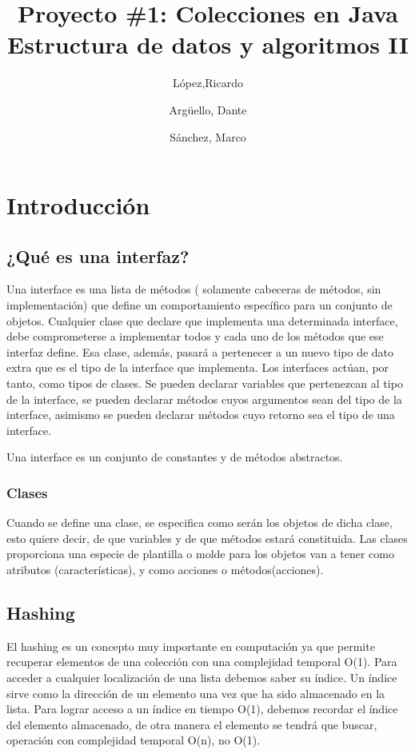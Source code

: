 \documentclass[11pt]{article}
\title{Proyecto \#1: Colecciones en Java\\
Estructura de datos y algoritmos II}
\author{López,Ricardo
\and Argüello, Dante
\and Sánchez, Marco}
\begin{document}
\maketitle{}

\section{Introducción}
\subsection{¿Qué es una interfaz?}

\par
Una interface es una lista de métodos ( solamente cabeceras de 
métodos, sin implementación) que define un comportamiento específico 
para un conjunto de objetos. Cualquier clase que declare que 
implementa una determinada interface, debe comprometerse a 
implementar todos y cada uno de los métodos que ese interfaz define. 
Esa clase, además, pasará a pertenecer a un nuevo tipo de dato extra 
que es el tipo de la interface que implementa. Los interfaces actúan, 
por tanto, como tipos de clases. Se pueden declarar variables que 
pertenezcan al tipo de la interface, se pueden declarar métodos cuyos 
argumentos sean del tipo de la interface, asimismo se pueden declarar 
métodos cuyo retorno sea el tipo de una interface.

\par
Una interface es un conjunto de constantes y de métodos abstractos.

\subsubsection{Clases}

\par
Cuando se define una clase, se especifica como serán los objetos de 
dicha clase, esto quiere decir, de que variables y de que métodos 
estará constituida. Las clases proporciona una especie de plantilla o 
molde para los objetos van a tener como atributos (características), 
y como acciones o métodos(acciones).



\subsection{Hashing}
\par
El hashing es un concepto muy importante en computación ya que 
permite recuperar elementos de una colección con una complejidad 
temporal O(1).  Para acceder a cualquier localización de una lista 
debemos saber su índice. Un índice sirve como la dirección de un 
elemento una vez que ha sido almacenado en la lista. Para lograr 
acceso a un índice en tiempo O(1), debemos recordar el índice del 
elemento almacenado, de otra manera el elemento se tendrá que buscar, 
operación con complejidad temporal O(n), no O(1). 
\end{document}

